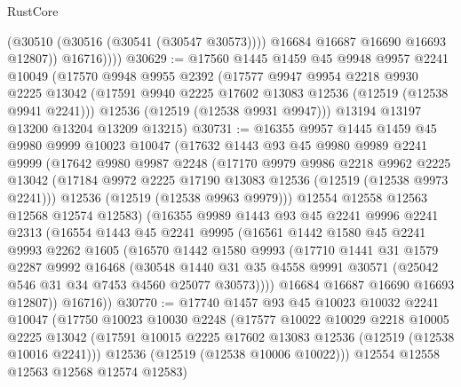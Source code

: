 \begin{lexlean}{RustCore}
\begin{coremodule}
                (@30510 (@30516 (@30541 (@30547 @30573))))
                @16684
                @16687
                @16690
                @16693
                @12807))
            @16716))))
@30629 := @17560
    @1445
    @1459
    @45
    @9948
    @9957
    @2241
    @10049
    (@17570
      @9948
      @9955
      @2392
      (@17577
        @9947
        @9954
        @2218
        @9930
        @2225
        @13042
        (@17591 @9940 @2225 @17602 @13083 @12536 (@12519 (@12538 @9941 @2241)))
        @12536
        (@12519 (@12538 @9931 @9947)))
      @13194
      @13197
      @13200
      @13204
      @13209
      @13215)
@30731 := @16355
    @9957
    @1445
    @1459
    @45
    @9980
    @9999
    @10023
    @10047
    (@17632
      @1443
      @93
      @45
      @9980
      @9989
      @2241
      @9999
      (@17642
        @9980
        @9987
        @2248
        (@17170
          @9979
          @9986
          @2218
          @9962
          @2225
          @13042
          (@17184 @9972 @2225 @17190 @13083 @12536 (@12519 (@12538 @9973 @2241)))
          @12536
          (@12519 (@12538 @9963 @9979)))
        @12554
        @12558
        @12563
        @12568
        @12574
        @12583)
      (@16355
        @9989
        @1443
        @93
        @45
        @2241
        @9996
        @2241
        @2313
        (@16554
          @1443
          @45
          @2241
          @9995
          (@16561
            @1442
            @1580
            @45
            @2241
            @9993
            @2262
            @1605
            (@16570
              @1442
              @1580
              @9993
              (@17710
                @1441
                @31
                @1579
                @2287
                @9992
                @16468
                (@30548
                  @1440
                  @31
                  @35
                  @4558
                  @9991
                  @30571
                  (@25042 @546 @31 @34 @7453 @4560 @25077 @30573))))
            @16684
            @16687
            @16690
            @16693
            @12807))
        @16716))
@30770 := @17740
    @1457
    @93
    @45
    @10023
    @10032
    @2241
    @10047
    (@17750
      @10023
      @10030
      @2248
      (@17577
        @10022
        @10029
        @2218
        @10005
        @2225
        @13042
        (@17591 @10015 @2225 @17602 @13083 @12536 (@12519 (@12538 @10016 @2241)))
        @12536
        (@12519 (@12538 @10006 @10022)))
      @12554
      @12558
      @12563
      @12568
      @12574
      @12583)

\end{coremodule}
\end{lexlean}

